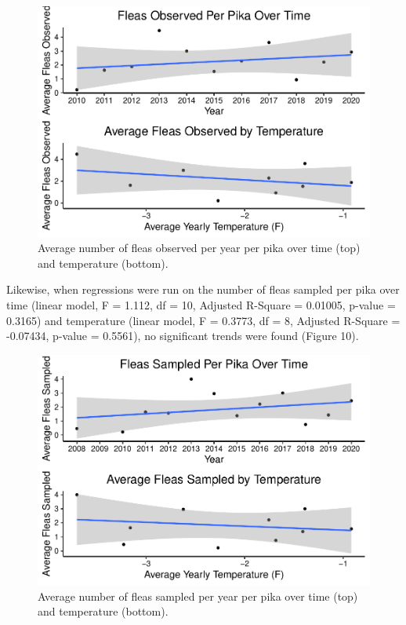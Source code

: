 \documentclass[
  12pt,
]{article}
\begin{document}
\begin{figure}
\centering
\includegraphics{FreedmanDye_ENV872_Project_files/figure-latex/unnamed-chunk-8-1.pdf}
\caption{Average number of fleas observed per year per pika over time
(top) and temperature (bottom).}
\end{figure}

Likewise, when regressions were run on the number of fleas sampled per
pika over time (linear model, F = 1.112, df = 10, Adjusted R-Square =
0.01005, p-value = 0.3165) and temperature (linear model, F = 0.3773, df
= 8, Adjusted R-Square = -0.07434, p-value = 0.5561), no significant
trends were found (Figure 10).

\begin{figure}
\centering
\includegraphics{FreedmanDye_ENV872_Project_files/figure-latex/unnamed-chunk-9-1.pdf}
\caption{Average number of fleas sampled per year per pika over time
(top) and temperature (bottom).}
\end{figure}
\end{document}
